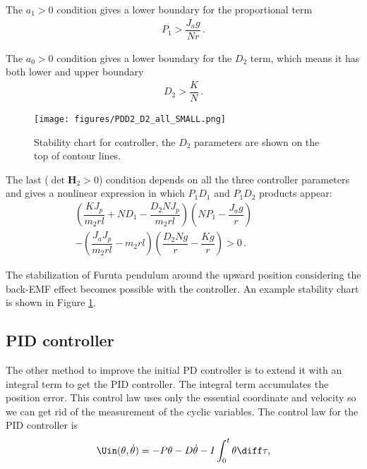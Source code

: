 \noindent
The $a_1>0$ condition gives a lower boundary for the proportional term
\begin{align}
	P_1 > \dfrac{J_a g}{N r}\,.
\end{align} 

\noindent
The $a_0>0$ condition gives a lower boundary for the $D_2$ term, which means it has both lower and upper boundary
\begin{align}
	D_2 > \dfrac{K}{N}\,.
\end{align}


\begin{figure}[h]
	\centering
	\texttt{[image: figures/PDD2\_D2\_all\_SMALL.png]}
	\caption{Stability chart for \PDD{} controller, the $D_2$ parameters are shown on the top of contour lines.}
	\label{fig:PDD2_D2_all}
\end{figure}

\noindent
The last ($\det \mathbf H_2>0$) condition depends on all the three controller parameters and gives a nonlinear expression in which $P_1 D_1$ and $P_1  D_2$ products appear:
\begin{align}
\left(\dfrac{KJ_p}{m_2 r l} + ND_1 - \dfrac{D_2 N J_p}{m_2 r l} \right)
\left(NP_1 - \dfrac{J_a g}{r} \right) \phantom{===}\nonumber\\
-
\left(\dfrac{J_a J_p}{m_2 r l}- m_2 r l \right)
\left(\dfrac{D_2 N g}{r}-\dfrac{Kg}{r} \right) >0 \,.
\end{align}



The stabilization of Furuta pendulum around the upward position considering the back-EMF effect becomes possible with the \PDD{} controller. An example stability chart is shown in Figure \ref{fig:PDD2_D2_all}.






\subsection{PID controller}
The other method to improve the initial PD controller is to extend it with an integral term to get the PID controller. The integral term accumulates the position error. This control law uses only the essential coordinate and velocity so we can get rid of the measurement of the cyclic variables.
The control law for the PID controller is
\begin{align}
	\Uin(\theta, \dot\theta) = -P\theta -D\dot\theta - I \int_{0}^{t} \theta \diff \tau, \label{eq:PID_controller}
\end{align}

